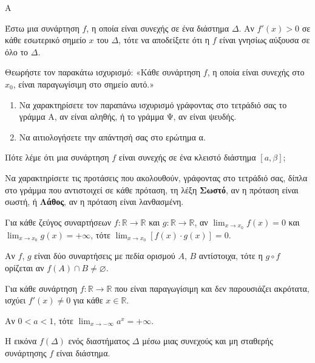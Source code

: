 \begin{thema}{Α}
\begin{erwthma}
    \item Έστω μια συνάρτηση $f$, η οποία είναι συνεχής σε ένα διάστημα $\Delta$. Αν $f'(x) > 0$ σε κάθε εσωτερικό σημείο $x$ του $\Delta$, τότε να αποδείξετε ότι η $f$ είναι γνησίως αύξουσα σε όλο το $\Delta$. 
    \item Θεωρήστε τον παρακάτω ισχυρισμό: «Κάθε συνάρτηση $f$, η οποία είναι συνεχής στο $x_0$, είναι παραγωγίσιμη στο σημείο αυτό.»
    \begin{enumerate}[label=\alph*.]
        \item Να χαρακτηρίσετε τον παραπάνω ισχυρισμό γράφοντας στο τετράδιό σας το γράμμα Α, αν είναι αληθής, ή το γράμμα Ψ, αν είναι ψευδής. 
        \item Να αιτιολογήσετε την απάντησή σας στο ερώτημα α. 
    \end{enumerate}
    \item Πότε λέμε ότι μια συνάρτηση $f$ είναι συνεχής σε ένα κλειστό διάστημα $[a, \beta]$; 
    \item Να χαρακτηρίσετε τις προτάσεις που ακολουθούν, γράφοντας στο τετράδιό σας, δίπλα στο γράμμα που αντιστοιχεί σε κάθε πρόταση, τη λέξη \textbf{Σωστό}, αν η πρόταση είναι σωστή, ή \textbf{Λάθος}, αν η πρόταση είναι λανθασμένη.
    \begin{alist}
        \item Για κάθε ζεύγος συναρτήσεων $f : \mathbb{R} \to \mathbb{R}$ και $g : \mathbb{R} \to \mathbb{R}$, αν $\displaystyle\lim_{x \to x_0} f(x) = 0$ και $\displaystyle\lim_{x \to x_0} g(x) = +\infty$, τότε $\displaystyle\lim_{x \to x_0} [f(x) \cdot g(x)] = 0$.
        \item Αν $f$, $g$ είναι δύο συναρτήσεις με πεδία ορισμού $A$, $B$ αντίστοιχα, τότε η $g \circ f$ ορίζεται αν $f(A) \cap B \neq \varnothing$.
        \item Για κάθε συνάρτηση $f : \mathbb{R} \to \mathbb{R}$ που είναι παραγωγίσιμη και δεν παρουσιάζει ακρότατα, ισχύει $f'(x) \neq 0$ για κάθε $x \in \mathbb{R}$.
        \item Αν $0 < a < 1$, τότε $\displaystyle\lim_{x \to -\infty} a^x = +\infty$.
        \item Η εικόνα $f(\Delta)$ ενός διαστήματος $\Delta$ μέσω μιας συνεχούς και μη σταθερής συνάρτησης $f$ είναι διάστημα.
    \end{alist} 
\end{erwthma}
\end{thema}

